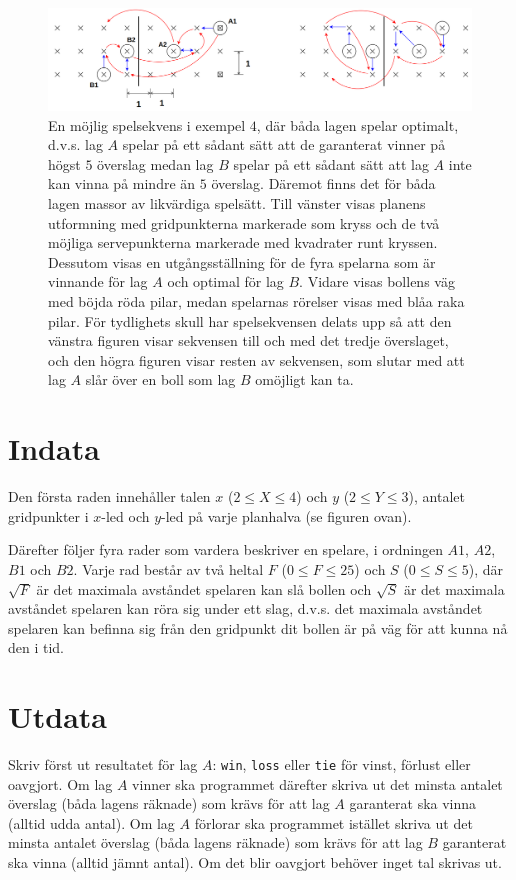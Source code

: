 \begin{figure}[h]
    \centering
    \includegraphics[width=1.0\textwidth]{grid}
    \caption{En möjlig spelsekvens i exempel $4$, där båda lagen spelar optimalt, d.v.s. lag $A$ spelar på ett sådant sätt att de garanterat vinner på högst $5$ överslag medan lag $B$ spelar på ett sådant sätt att lag $A$ inte kan vinna på mindre än $5$ överslag.
    Däremot finns det för båda lagen massor av likvärdiga spelsätt.
    Till vänster visas planens utformning med gridpunkterna markerade som kryss och de två möjliga servepunkterna markerade med kvadrater runt kryssen.
    Dessutom visas en utgångsställning för de fyra spelarna som är vinnande för lag $A$ och optimal för lag $B$.
    Vidare visas bollens väg med böjda röda pilar, medan spelarnas rörelser visas med blåa raka pilar.
    För tydlighets skull har spelsekvensen delats upp så att den vänstra figuren visar sekvensen till och med det tredje överslaget, och den högra figuren visar resten av sekvensen, som slutar med att lag $A$ slår över en boll som lag $B$ omöjligt kan ta.
    }
\end{figure}

\section*{Indata}
Den första raden innehåller talen $x$ ($2 \le X \le 4$) och $y$ ($2 \le Y \le 3$), antalet gridpunkter i $x$-led och $y$-led på varje planhalva (se figuren ovan).

Därefter följer fyra rader som vardera beskriver en spelare, i ordningen $A1$, $A2$, $B1$ och $B2$.
Varje rad består av två heltal $F$ ($0 \le F \le 25$)  och $S$ ($0 \le S \le 5$), där $\sqrt{F}$ är det maximala avståndet spelaren kan slå bollen och $\sqrt{S}$ är det maximala avståndet spelaren kan röra sig under ett slag, d.v.s. det maximala avståndet spelaren kan befinna sig från den gridpunkt dit bollen är på väg för att kunna nå den i tid.

\section*{Utdata}
Skriv först ut resultatet för lag $A$: \texttt{win}, \texttt{loss} eller \texttt{tie} för vinst, förlust eller oavgjort.
Om lag $A$ vinner ska programmet därefter skriva ut det minsta antalet överslag (båda lagens räknade) som krävs för att lag $A$ garanterat ska vinna (alltid udda antal).
Om lag $A$ förlorar ska programmet istället skriva ut det minsta antalet överslag (båda lagens räknade) som krävs för att lag $B$ garanterat ska vinna (alltid jämnt antal).
Om det blir oavgjort behöver inget tal skrivas ut.

